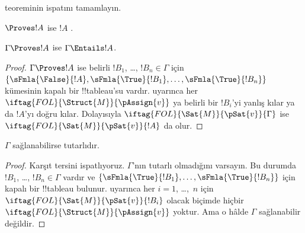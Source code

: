 \documentclass[../../../include/open-logic-section]{subfiles}
\begin{document}
\begin{prob}
 teoreminin ispatını tamamlayın.
\end{prob}
\tagendprob

\begin{cor}
$\Proves !A$ ise $!A$ .
\end{cor}

\begin{cor}
$\Gamma \Proves !A$ ise $\Gamma \Entails !A$.
\end{cor}

\begin{proof}
  $\Gamma \Proves !A$ ise belirli $!B_1$, \dots, $!B_n \in \Gamma$ için
  $\{\sFmla{\False}{!A}, \sFmla{\True}{!B_1}, \dots,
  \sFmla{\True}{!B_n}\}$ kümesinin kapalı bir !!{tableau}'su vardır.
   uyarınca her
  ~$\iftag{FOL}{\Struct{M}}{\pAssign{v}}$
  ya belirli bir $!B_i$'yi yanlış kılar ya da $!A$'yı doğru kılar. Dolayısıyla
  $\iftag{FOL}{\Sat{M}}{\pSat{v}}{\Gamma}$ ise
  $\iftag{FOL}{\Sat{M}}{\pSat{v}}{!A}$ da olur.
\end{proof}

\begin{cor}
$\Gamma$ sağlanabilirse tutarlıdır.
\end{cor}

\begin{proof}
Karşıt tersini ispatlıyoruz. $\Gamma$'nın tutarlı olmadığını varsayın. Bu
durumda $!B_1$, \dots, $!B_n \in \Gamma$ vardır ve
$\{\sFmla{\True}{!B_1}, \dots, \sFmla{\True}{!B_n}\}$ için kapalı bir
!!{tableau} bulunur.  uyarınca her
$i=1$, \dots,~$n$ için $\iftag{FOL}{\Sat{M}}{\pSat{v}}{!B_i}$ olacak
biçimde hiçbir $\iftag{FOL}{\Struct{M}}{\pAssign{v}}$ yoktur. Ama o hâlde
$\Gamma$ sağlanabilir değildir.
\end{proof}
\end{document}
